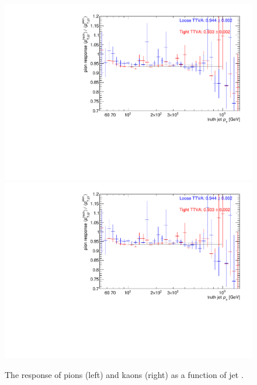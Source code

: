 \begin{figure}
\centering
\includegraphics[scale=0.3, page=1]{figures/jet_comp_study_powheg_Tight_MultiplicityFraction_withLooseandTight.pdf}
\includegraphics[scale=0.3, page=2]{figures/jet_comp_study_powheg_Tight_MultiplicityFraction_withLooseandTight.pdf}
\caption {The response of pions (left) and  kaons (right) as a function of jet \pT.}
\label{fig:response pion and kaon}
\end{figure}

